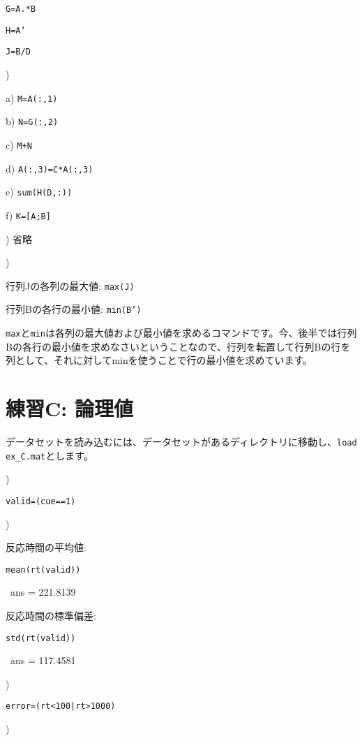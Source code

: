 \documentclass{jsarticle}
\begin{document}
{\tt G=A.*B}

{\tt H=A'}

{\tt J=B/D}

\bigskip

)

a) {\tt M=A(:,1)}

b) {\tt N=G(:,2)}

c) {\tt M+N}

d) {\tt A(:,3)=C*A(:,3)}

e) {\tt sum(H(D,:))}

f) {\tt K=[A;B]}

\bigskip

) 省略

\bigskip

)

行列Jの各列の最大値: {\tt max(J)}

行列Bの各行の最小値: {\tt min(B')}

\begin{screen}
{\tt max}と{\tt min}は各列の最大値および最小値を求めるコマンドです。今、後半では行列Bの各行の最小値を求めなさいということなので、行列を転置して行列Bの行を列として、それに対してminを使うことで行の最小値を求めています。
\end{screen}

\section{練習C: 論理値}

\begin{screen}
データセットを読み込むには、データセットがあるディレクトリに移動し、{\tt load ex\_C.mat}とします。
\end{screen}

)

{\tt valid=(cue==1)}

\bigskip

)

反応時間の平均値: {\tt mean(rt(valid)) 

\ ans = 221.8139}

反応時間の標準偏差: {\tt std(rt(valid)) 

\ ans = 117.4581}

\bigskip

)

{\tt error=(rt<100|rt>1000)}

\bigskip

)
\end{document}
